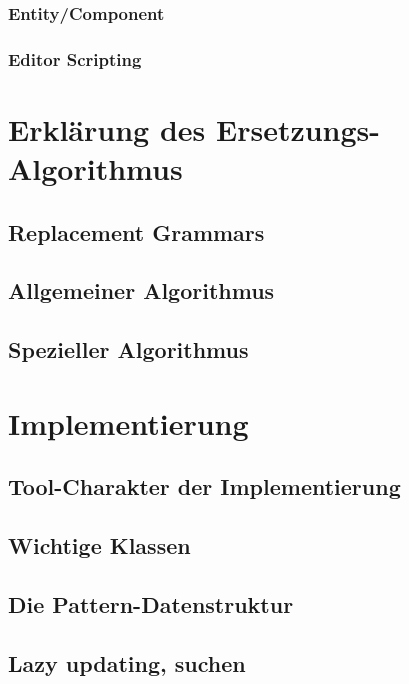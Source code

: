 \subsection{Entity/Component}

\subsection{Editor Scripting}


\chapter{Erklärung des Ersetzungs-Algorithmus}

\section{Replacement Grammars}

\section{Allgemeiner Algorithmus}

\section{Spezieller Algorithmus}


\chapter{Implementierung}


\section{Tool-Charakter der Implementierung}

\section{Wichtige Klassen}


\section{Die Pattern-Datenstruktur}

\section{Lazy updating, suchen}


